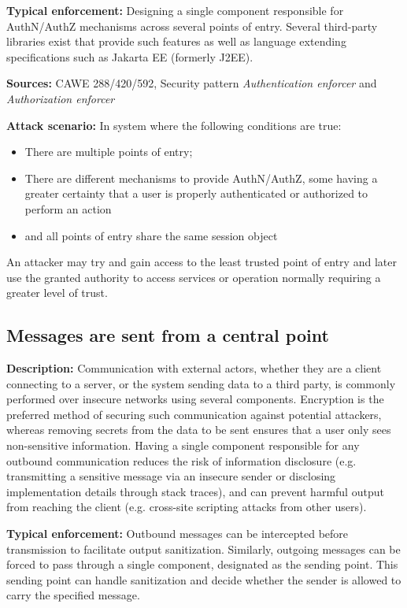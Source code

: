  \textbf{Typical enforcement:} Designing a single component responsible for AuthN/AuthZ mechanisms across several points of entry. Several third-party libraries exist that provide such features as well as language extending specifications such as Jakarta EE (formerly J2EE). 
 
 \textbf{Sources:} CAWE 288/420/592, Security pattern \textit{Authentication enforcer} and \textit{Authorization enforcer}
 
 \textbf{Attack scenario:} In system where the following conditions are true:
 
 \begin{itemize}
     \item There are multiple points of entry; 
     \item There are different mechanisms to provide AuthN/AuthZ, some having a greater certainty that a user is properly authenticated or authorized to perform an action
     \item and all points of entry share the same session object
 \end{itemize}
 
  An attacker may try and gain access to the least trusted point of entry and later use the granted authority to access services or operation normally requiring a greater level of trust.

\subsection{Messages are sent from a central point} 

\textbf{Description:} 
Communication with external actors, whether they are a client connecting to a server, or the system sending data to a third party, is commonly performed over insecure networks using several components. Encryption is the preferred method of securing such communication against potential attackers, whereas removing secrets from the data to be sent ensures that a user only sees non-sensitive information. Having a single component responsible for any outbound communication reduces the risk of information disclosure (e.g. transmitting a sensitive message via an insecure sender or disclosing implementation details through stack traces), and can prevent harmful output from reaching the client (e.g. cross-site scripting attacks from other users). 
 
 \textbf{Typical enforcement:} 
 Outbound messages can be intercepted before transmission to facilitate output sanitization. Similarly, outgoing messages can be forced to pass through a single component, designated as the sending point. This sending point can handle sanitization and decide whether the sender is allowed to carry the specified message.
 

